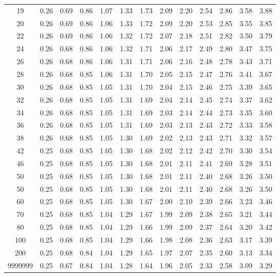 \begin{center}
\begin{tabular}{c | c c c c c c c c c c c c}
19 & 0.26 & 0.69 & 0.86 & 1.07 & 1.33 & 1.73 & 2.09 & 2.20 & 2.54 & 2.86 & 3.58 & 3.88 \\
20 & 0.26 & 0.69 & 0.86 & 1.06 & 1.33 & 1.72 & 2.09 & 2.20 & 2.53 & 2.85 & 3.55 & 3.85 \\
22 & 0.26 & 0.69 & 0.86 & 1.06 & 1.32 & 1.72 & 2.07 & 2.18 & 2.51 & 2.82 & 3.50 & 3.79 \\
24 & 0.26 & 0.68 & 0.86 & 1.06 & 1.32 & 1.71 & 2.06 & 2.17 & 2.49 & 2.80 & 3.47 & 3.75 \\
26 & 0.26 & 0.68 & 0.86 & 1.06 & 1.31 & 1.71 & 2.06 & 2.16 & 2.48 & 2.78 & 3.43 & 3.71 \\
28 & 0.26 & 0.68 & 0.85 & 1.06 & 1.31 & 1.70 & 2.05 & 2.15 & 2.47 & 2.76 & 3.41 & 3.67 \\
30 & 0.26 & 0.68 & 0.85 & 1.05 & 1.31 & 1.70 & 2.04 & 2.15 & 2.46 & 2.75 & 3.39 & 3.65 \\
32 & 0.26 & 0.68 & 0.85 & 1.05 & 1.31 & 1.69 & 2.04 & 2.14 & 2.45 & 2.74 & 3.37 & 3.62 \\
34 & 0.26 & 0.68 & 0.85 & 1.05 & 1.31 & 1.69 & 2.03 & 2.14 & 2.44 & 2.73 & 3.35 & 3.60 \\
36 & 0.26 & 0.68 & 0.85 & 1.05 & 1.31 & 1.69 & 2.03 & 2.13 & 2.43 & 2.72 & 3.33 & 3.58 \\
38 & 0.26 & 0.68 & 0.85 & 1.05 & 1.30 & 1.69 & 2.02 & 2.13 & 2.43 & 2.71 & 3.32 & 3.57 \\
42 & 0.25 & 0.68 & 0.85 & 1.05 & 1.30 & 1.68 & 2.02 & 2.12 & 2.42 & 2.70 & 3.30 & 3.54 \\
46 & 0.25 & 0.68 & 0.85 & 1.05 & 1.30 & 1.68 & 2.01 & 2.11 & 2.41 & 2.69 & 3.28 & 3.51 \\
50 & 0.25 & 0.68 & 0.85 & 1.05 & 1.30 & 1.68 & 2.01 & 2.11 & 2.40 & 2.68 & 3.26 & 3.50 \\
50 & 0.25 & 0.68 & 0.85 & 1.05 & 1.30 & 1.68 & 2.01 & 2.11 & 2.40 & 2.68 & 3.26 & 3.50 \\
60 & 0.25 & 0.68 & 0.85 & 1.05 & 1.30 & 1.67 & 2.00 & 2.10 & 2.39 & 2.66 & 3.23 & 3.46 \\
70 & 0.25 & 0.68 & 0.85 & 1.04 & 1.29 & 1.67 & 1.99 & 2.09 & 2.38 & 2.65 & 3.21 & 3.44 \\
80 & 0.25 & 0.68 & 0.85 & 1.04 & 1.29 & 1.66 & 1.99 & 2.09 & 2.37 & 2.64 & 3.20 & 3.42 \\
100 & 0.25 & 0.68 & 0.85 & 1.04 & 1.29 & 1.66 & 1.98 & 2.08 & 2.36 & 2.63 & 3.17 & 3.39 \\
200 & 0.25 & 0.68 & 0.84 & 1.04 & 1.29 & 1.65 & 1.97 & 2.07 & 2.35 & 2.60 & 3.13 & 3.34 \\
9999999 & 0.25 & 0.67 & 0.84 & 1.04 & 1.28 & 1.64 & 1.96 & 2.05 & 2.33 & 2.58 & 3.09 & 3.29 \\
\end{tabular}
\end{center}
\renewcommand{\arraystretch}{1.5}
\setlength{\tabcolsep}{5pt}